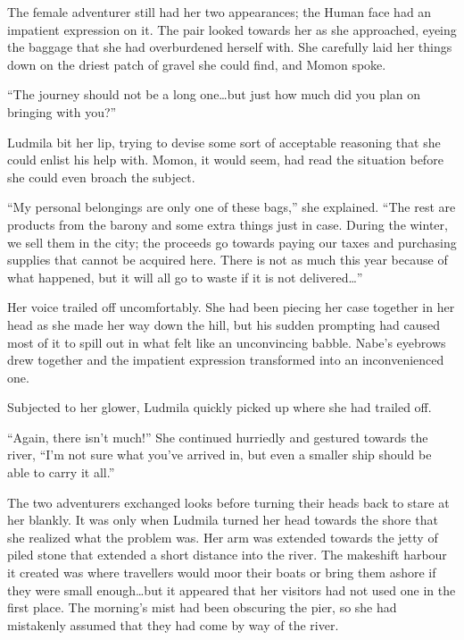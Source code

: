  

The female adventurer still had her two appearances; the Human face had an impatient expression on it. The pair looked towards her as she approached, eyeing the baggage that she had overburdened herself with. She carefully laid her things down on the driest patch of gravel she could find, and Momon spoke.

 

“The journey should not be a long one…but just how much did you plan on bringing with you?”

 

Ludmila bit her lip, trying to devise some sort of acceptable reasoning that she could enlist his help with. Momon, it would seem, had read the situation before she could even broach the subject.

 

“My personal belongings are only one of these bags,” she explained. “The rest are products from the barony and some extra things just in case. During the winter, we sell them in the city; the proceeds go towards paying our taxes and purchasing supplies that cannot be acquired here. There is not as much this year because of what happened, but it will all go to waste if it is not delivered…”

 

Her voice trailed off uncomfortably. She had been piecing her case together in her head as she made her way down the hill, but his sudden prompting had caused most of it to spill out in what felt like an unconvincing babble. Nabe’s eyebrows drew together and the impatient expression transformed into an inconvenienced one.

 

Subjected to her glower, Ludmila quickly picked up where she had trailed off.

 

“Again, there isn’t much!” She continued hurriedly and gestured towards the river, “I’m not sure what you’ve arrived in, but even a smaller ship should be able to carry it all.”

 

The two adventurers exchanged looks before turning their heads back to stare at her blankly. It was only when Ludmila turned her head towards the shore that she realized what the problem was. Her arm was extended towards the jetty of piled stone that extended a short distance into the river. The makeshift harbour it created was where travellers would moor their boats or bring them ashore if they were small enough…but it appeared that her visitors had not used one in the first place. The morning’s mist had been obscuring the pier, so she had mistakenly assumed that they had come by way of the river.

